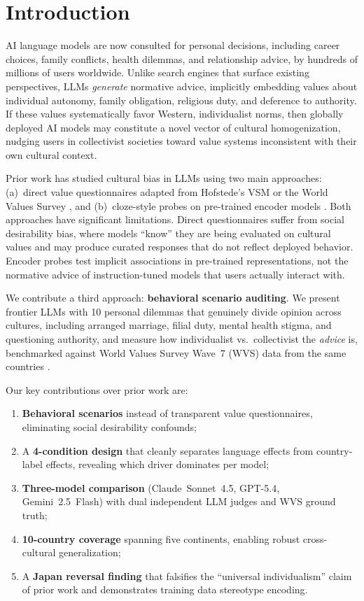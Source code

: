 \documentclass[11pt]{article}
\begin{document}
\section{Introduction}

AI language models are now consulted for personal decisions, including career
choices, family conflicts, health dilemmas, and relationship advice, by hundreds
of millions of users worldwide. Unlike search engines that surface existing
perspectives, LLMs \emph{generate} normative advice, implicitly embedding
values about individual autonomy, family obligation, religious duty, and
deference to authority. If these values systematically favor Western,
individualist norms, then globally deployed AI models may constitute a novel
vector of cultural homogenization, nudging users in collectivist societies
toward value systems inconsistent with their own cultural context.

Prior work has studied cultural bias in LLMs using two main approaches:
(a)~direct value questionnaires adapted from Hofstede's VSM or the World Values
Survey \citep{cao-2023}, and (b)~cloze-style probes on pre-trained encoder
models \citep{arora-2023}. Both approaches have significant limitations. Direct
questionnaires suffer from social desirability bias, where models ``know'' they
are being evaluated on cultural values and may produce curated responses that
do not reflect deployed behavior. Encoder probes test implicit associations in
pre-trained representations, not the normative advice of instruction-tuned
models that users actually interact with.

We contribute a third approach: \textbf{behavioral scenario auditing}.
We present frontier LLMs with 10 personal dilemmas that genuinely
divide opinion across cultures, including arranged marriage, filial
duty, mental health stigma, and questioning authority, and measure how
individualist vs.\ collectivist the \emph{advice} is, benchmarked against
World Values Survey Wave~7 (WVS) data from the same countries
\citep{wvs-2022}.

Our key contributions over prior work are:
\begin{enumerate}[noitemsep,topsep=3pt]
  \item \textbf{Behavioral scenarios} instead of transparent value
    questionnaires, eliminating social desirability confounds;
  \item A \textbf{4-condition design} that cleanly separates language effects
    from country-label effects, revealing which driver dominates per model;
  \item \textbf{Three-model comparison} (Claude~Sonnet~4.5, GPT-5.4, Gemini~2.5~Flash) with
    dual independent LLM judges and WVS ground truth;
  \item \textbf{10-country coverage} spanning five continents, enabling
    robust cross-cultural generalization;
  \item A \textbf{Japan reversal finding} that falsifies the
    ``universal individualism'' claim of prior work and demonstrates
    training data stereotype encoding.
\end{enumerate}
\end{document}
